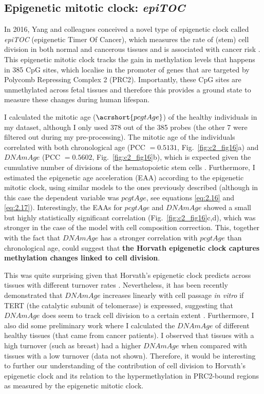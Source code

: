 \subsection{Epigenetic mitotic clock: \textit{epiTOC}} \label{s:2.3.2}

In 2016, Yang and colleagues conceived a novel type of epigenetic clock called \textit{\acrshort{epiTOC}} (epigenetic Timer Of Cancer), which measures the rate of (stem) cell division in both normal and cancerous tissues and is associated with cancer risk \citep{Yang2016}. This epigenetic mitotic clock tracks the gain in methylation levels that happens in 385 CpG sites, which localise in the promoter of genes that are targeted by Polycomb Repressing Complex 2 (\acrshort{PRC2}). Importantly, these CpG sites are unmethylated across fetal tissues and therefore this provides a ground state to measure these changes during human lifespan.

\bigskip

I calculated the mitotic age ($\acrshort{pcgtAge}$) of the healthy individuals in my dataset, although I only used 378 out of the 385 probes (the other 7 were filtered out during my pre-processing). The mitotic age of the individuals correlated with both chronological age (PCC $= 0.5131$, Fig.~\ref{fig:c2_fig16}a) and $DNAmAge$ (PCC $= 0.5602$, Fig.~\ref{fig:c2_fig16}b), which is expected given the cumulative number of divisions of the hematopoietic stem cells \citep{Beerman2013}. Furthermore, I estimated the epigenetic age acceleration (EAA) according to the epigenetic mitotic clock, using similar models to the ones previously described (although in this case the dependent variable was $pcgtAge$, see equations \ref{eq:2.16} and \ref{eq:2.17}). Interestingly, the EAAs for $pcgtAge$ and $DNAmAge$ showed a small but highly statistically significant correlation (Fig.~\ref{fig:c2_fig16}c,d), which was stronger in the case of the model with cell composition correction. This, together with the fact that $DNAmAge$ has a stronger correlation with $pcgtAge$ than chronological age, could suggest that \textbf{the Horvath epigenetic clock captures methylation changes linked to cell division}. 

\bigskip

This was quite surprising given that Horvath's epigenetic clock predicts across tissues with different turnover rates \citep{Yang2016}. Nevertheless, it has been recently demonstrated that $DNAmAge$ increases linearly with cell passage \textit{in vitro} if TERT (the catalytic subunit of telomerase) is expressed, suggesting that $DNAmAge$ does seem to track cell division to a certain extent \citep{Lu2018}. Furthermore, I also did some preliminary work where I calculated the $DNAmAge$ of different healthy tissues (that came from cancer patients). I observed that tissues with a high turnover (such as breast) \citep{Horvath2013,Sehl2017} had a higher $DNAmAge$ when compared with tissues with a low turnover (data not shown). Therefore, it would be interesting to further our understanding of the contribution of cell division to Horvath's epigenetic clock and its relation to the hypermethylation in PRC2-bound regions as measured by the epigenetic mitotic clock.    


